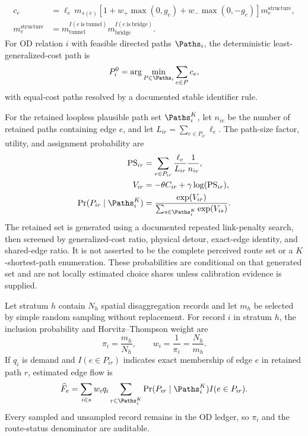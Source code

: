 \begin{align}
c_e
 &= \ell_e\,m_{s(e)}
 \left[1+w_{+}\max(0,g_e)+w_{-}\max(0,-g_e)\right]
 m_e^{\mathrm{structure}},
\label{eq:routing-cost}\\
m_e^{\mathrm{structure}}
 &= m_{\mathrm{tunnel}}^{I(e\ \mathrm{is\ tunnel})}
    m_{\mathrm{bridge}}^{I(e\ \mathrm{is\ bridge})}.
\label{eq:structure-cost}
\end{align}
For OD relation $i$ with feasible directed paths $\Paths_i$, the deterministic
least-generalized-cost path is
\begin{equation}
P_i^{0}
=\arg\min_{P\in\Paths_i}\sum_{e\in P}c_e,
\label{eq:least-cost-path}
\end{equation}
with equal-cost paths resolved by a documented stable identifier rule.

For the retained loopless plausible path set $\Paths_i^K$, let $n_{ie}$ be the
number of retained paths containing edge $e$, and let
$L_{ir}=\sum_{e\in P_{ir}}\ell_e$. The path-size factor, utility, and assignment
probability are
\begin{align}
\operatorname{PS}_{ir}
 &=\sum_{e\in P_{ir}}\frac{\ell_e}{L_{ir}}\frac{1}{n_{ie}},
\label{eq:path-size-factor}\\
V_{ir}
 &=-\theta C_{ir}+\gamma\log(\operatorname{PS}_{ir}),
\label{eq:path-utility}\\
\Pr(P_{ir}\mid\Paths_i^K)
 &=\frac{\exp(V_{ir})}{\sum_{s\in\Paths_i^K}\exp(V_{is})}.
\label{eq:path-size-logit}
\end{align}
The retained set is generated using a documented repeated link-penalty search,
then screened by generalized-cost ratio, physical detour, exact-edge identity,
and shared-edge ratio. It is not asserted to be the complete perceived route
set or a $K$-shortest-path enumeration. These probabilities are conditional on
that generated set and are not locally estimated choice shares unless
calibration evidence is supplied.

Let stratum $h$ contain $N_h$ spatial disaggregation records and let $m_h$ be
selected by simple random sampling without replacement. For record $i$ in
stratum $h$, the inclusion probability and Horvitz--Thompson weight are
\begin{equation}
\pi_i=\frac{m_h}{N_h},\qquad w_i=\frac{1}{\pi_i}=\frac{N_h}{m_h}.
\label{eq:route-sample-weight}
\end{equation}
If $q_i$ is demand and $I(e\in P_{ir})$ indicates exact membership of edge $e$
in retained path $r$, estimated edge flow is
\begin{equation}
\widehat F_e
=\sum_{i\in s}w_i q_i
  \sum_{r\in\Paths_i^K}\Pr(P_{ir}\mid\Paths_i^K)I(e\in P_{ir}).
\label{eq:sampled-edge-flow}
\end{equation}
Every sampled and unsampled record remains in the OD ledger, so $\pi_i$ and the
route-status denominator are auditable.
